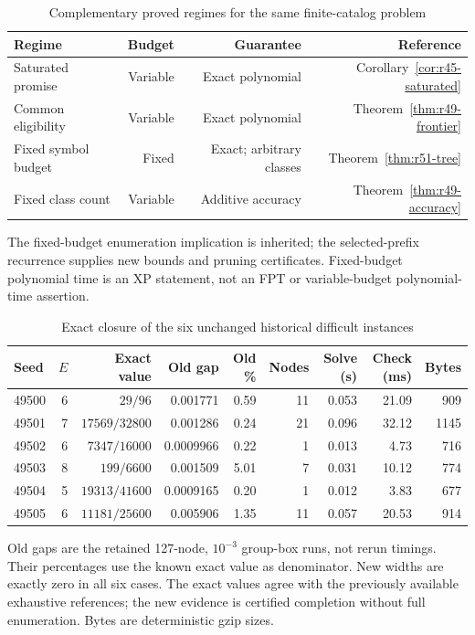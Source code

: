 \begin{table}[p]
\centering\small
\setlength{\tabcolsep}{3.5pt}
\caption{Complementary proved regimes for the same finite-catalog problem}\label{tab:r51-regimes}
\begin{tabular}{lrrr}
\toprule
Regime & Budget & Guarantee & Reference \\
\midrule
Saturated promise & Variable & Exact polynomial & Corollary~\ref{cor:r45-saturated} \\
Common eligibility & Variable & Exact polynomial & Theorem~\ref{thm:r49-frontier} \\
Fixed symbol budget & Fixed & Exact; arbitrary classes & Theorem~\ref{thm:r51-tree} \\
Fixed class count & Variable & Additive accuracy & Theorem~\ref{thm:r49-accuracy} \\
\bottomrule
\end{tabular}
\par\smallskip\begin{minipage}{\textwidth}\footnotesize The fixed-budget enumeration implication is inherited; the selected-prefix recurrence supplies new bounds and pruning certificates. Fixed-budget polynomial time is an XP statement, not an FPT or variable-budget polynomial-time assertion.\end{minipage}
\end{table}

\begin{table}[p]
\centering\small
\setlength{\tabcolsep}{3.5pt}
\caption{Exact closure of the six unchanged historical difficult instances}\label{tab:r51-hard}
\begin{tabular}{lrrrrrrrr}
\toprule
Seed & $E$ & Exact value & Old gap & Old \% & Nodes & Solve (s) & Check (ms) & Bytes \\
\midrule
49500 & 6 & $29/96$ & 0.001771 & 0.59 & 11 & 0.053 & 21.09 & 909 \\
49501 & 7 & $17569/32800$ & 0.001286 & 0.24 & 21 & 0.096 & 32.12 & 1145 \\
49502 & 6 & $7347/16000$ & 0.0009966 & 0.22 & 1 & 0.013 & 4.73 & 716 \\
49503 & 8 & $199/6600$ & 0.001509 & 5.01 & 7 & 0.031 & 10.12 & 774 \\
49504 & 5 & $19313/41600$ & 0.0009165 & 0.20 & 1 & 0.012 & 3.83 & 677 \\
49505 & 6 & $11181/25600$ & 0.005906 & 1.35 & 11 & 0.057 & 20.53 & 914 \\
\bottomrule
\end{tabular}
\par\smallskip\begin{minipage}{\textwidth}\footnotesize Old gaps are the retained 127-node, $10^{-3}$ group-box runs, not rerun timings. Their percentages use the known exact value as denominator. New widths are exactly zero in all six cases. The exact values agree with the previously available exhaustive references; the new evidence is certified completion without full enumeration. Bytes are deterministic gzip sizes.\end{minipage}
\end{table}

